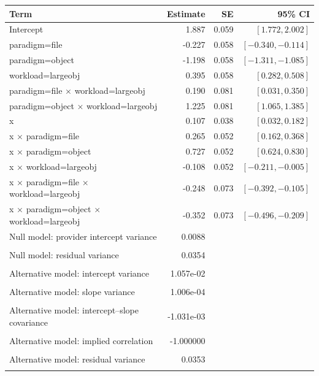 \begin{tabular}{lrrr}
\toprule
Term & Estimate & SE & 95\% CI \\
\midrule
Intercept & 1.887 & 0.059 & $[1.772, 2.002]$ \\
paradigm=file & -0.227 & 0.058 & $[-0.340, -0.114]$ \\
paradigm=object & -1.198 & 0.058 & $[-1.311, -1.085]$ \\
workload=largeobj & 0.395 & 0.058 & $[0.282, 0.508]$ \\
paradigm=file $\times$ workload=largeobj & 0.190 & 0.081 & $[0.031, 0.350]$ \\
paradigm=object $\times$ workload=largeobj & 1.225 & 0.081 & $[1.065, 1.385]$ \\
x & 0.107 & 0.038 & $[0.032, 0.182]$ \\
x $\times$ paradigm=file & 0.265 & 0.052 & $[0.162, 0.368]$ \\
x $\times$ paradigm=object & 0.727 & 0.052 & $[0.624, 0.830]$ \\
x $\times$ workload=largeobj & -0.108 & 0.052 & $[-0.211, -0.005]$ \\
x $\times$ paradigm=file $\times$ workload=largeobj & -0.248 & 0.073 & $[-0.392, -0.105]$ \\
x $\times$ paradigm=object $\times$ workload=largeobj & -0.352 & 0.073 & $[-0.496, -0.209]$ \\
\midrule
Null model: provider intercept variance & 0.0088 & & \\\\
Null model: residual variance & 0.0354 & & \\\\
Alternative model: intercept variance & 1.057e-02 & & \\\\
Alternative model: slope variance & 1.006e-04 & & \\\\
Alternative model: intercept--slope covariance & -1.031e-03 & & \\\\
Alternative model: implied correlation & -1.000000 & & \\\\
Alternative model: residual variance & 0.0353 & & \\\\
\bottomrule
\end{tabular}
